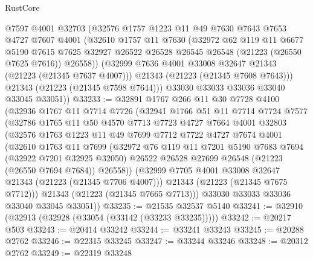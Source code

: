\begin{lexlean}{RustCore}
\begin{coremodule}
          @7597
          @4001
          @32703
          (@32576
            @1757
            @1223
            @11
            @49
            @7630
            @7643
            @7653
            @4727
            @7607
            @4001
            (@32610
              @1757
              @11
              @7630
              (@32972
                @62
                @119
                @11
                @6677
                @5190
                @7615
                @7625
                @32927
                @26522
                @26528
                @26545
                @26548
                (@21223 (@26550 @7625 @7616))
                @26558))
            (@32999 @7636 @4001 @33008 @32647 @21343 (@21223 (@21345 @7637 @4007)))
            @21343
            (@21223 (@21345 @7608 @7643)))
          @21343
          (@21223 (@21345 @7598 @7644)))
        @33030
        @33033
        @33036
        @33040
        @33045
        @33051))
@33233 := @32891
    @1767
    @266
    @11
    @30
    @7728
    @4100
    (@32936
      @1767
      @11
      @7714
      @7726
      (@32941
        @1766
        @51
        @11
        @7714
        @7724
        @7577
        (@32786
          @1765
          @11
          @50
          @4570
          @7713
          @7723
          @4727
          @7664
          @4001
          @32803
          (@32576
            @1763
            @1223
            @11
            @49
            @7699
            @7712
            @7722
            @4727
            @7674
            @4001
            (@32610
              @1763
              @11
              @7699
              (@32972
                @76
                @119
                @11
                @7201
                @5190
                @7683
                @7694
                (@32922 @7201 @32925 @32050)
                @26522
                @26528
                @27699
                @26548
                (@21223 (@26550 @7694 @7684))
                @26558))
            (@32999 @7705 @4001 @33008 @32647 @21343 (@21223 (@21345 @7706 @4007)))
            @21343
            (@21223 (@21345 @7675 @7712)))
          @21343
          (@21223 (@21345 @7665 @7713)))
        @33030
        @33033
        @33036
        @33040
        @33045
        @33051))
@33235 := @21535 @32537 @5140
@33241 := @32910 (@32913 (@32928 (@33054 (@33142 (@33233 @33235)))))
@33242 := @20217 @503
@33243 := @20414 @33242
@33244 := @33241 @33243
@33245 := @20288 @2762
@33246 := @22315 @33245
@33247 := @33244 @33246
@33248 := @20312 @2762
@33249 := @22319 @33248

\end{coremodule}
\end{lexlean}
